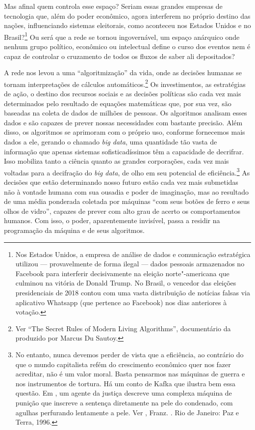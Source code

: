 Mas afinal quem controla esse espaço? Seriam essas grandes empresas de
tecnologia que, além do poder econômico, agora interferem no próprio
destino das nações, influenciando sistemas eleitorais, como aconteceu
nos Estados Unidos e no Brasil?\footnote{Nos Estados Unidos, a empresa
  de análise de dados e comunicação estratégica {}
  utilizou --- provavelmente de forma ilegal --- dados pessoais
  armazenados no Facebook para interferir decisivamente na eleição
  norte"-americana que culminou na vitória de Donald Trump. No Brasil, o
  vencedor das eleições presidenciais de 2018 contou com uma vasta
  distribuição de notícias falsas via aplicativo Whatsapp (que pertence
  ao Facebook) nos dias anteriores à votação.} Ou será que a rede se
tornou ingovernável, um espaço anárquico onde nenhum grupo político, econômico ou
intelectual define o curso dos eventos nem é capaz de controlar o
cruzamento de todos os fluxos de saber ali depositados?

A rede nos levou a uma ``algoritmização'' da vida, onde as decisões \label{algorismos}
humanas se tornam interpretações de cálculos automáticos.\footnote{Ver ``The Secret Rules of Modern Living Algorithms'', documentário da  produzido por Marcus Du Sautoy.} Os
investimentos, as estratégias de ação, o destino dos recursos sociais e
as decisões políticas são cada vez mais determinados pelo resultado de
equações matemáticas que, por sua vez, são baseadas na coleta de dados
de milhões de pessoas. Os algoritmos analisam esses dados e são capazes de prever nossas necessidades com bastante precisão. Além disso, os algoritmos se aprimoram com o próprio uso, conforme fornecemos mais dados a ele, gerando o chamado \emph{big data}, uma quantidade tão vasta de informação que apenas sistemas sofisticadíssimos têm a capacidade de decrifrar. Isso mobiliza tanto a ciência quanto as grandes corporações, cada vez mais voltadas para a decifração do \emph{big data}, de olho em seu potencial de eficiência.\footnote{No entanto, nunca devemos perder de vista que a eficiência, ao contrário do que o mundo capitalista refém do crescimento econômico quer nos fazer acreditar, não é um valor moral. Basta pensarmos nas máquinas de guerra e nos instrumentos de tortura. Há um conto de Kafka que ilustra bem essa questão. Em {}, um agente da justiça descreve uma complexa máquina de punição que inscreve a sentença diretamente na pele do condenado, com agulhas perfurando lentamente a pele. Ver , Franz. {}. Rio de Janeiro: Paz e Terra, 1996.}
As decisões que estão determinando nosso futuro
estão cada vez mais submetidas não à vontade humana com sua ousadia e
poder de imaginação, mas ao resultado de uma média ponderada coletada
por máquinas ``com seus botões de ferro e seus olhos de vidro'', capazes
de prever com alto grau de acerto os comportamentos humanos. Com isso,
o poder, aparentemente invisível, passa a residir na programação da
máquina e de seus algoritmos.

